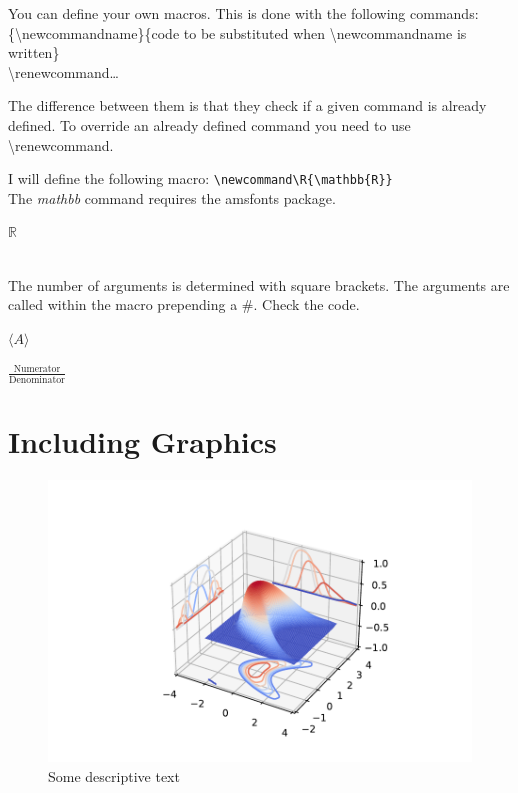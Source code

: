 \documentclass[a4paper]{article}
\newcommand{\bs}[1]{{\color{blue}\textbackslash{}#1}}
\begin{document}
You can define your own macros. This is done with the following commands:\\

\noindent\bs{newcommand}\{\bs{newcommandname}\}\{code to be substituted when \bs{newcommandname} is written\}\\
\bs{renewcommand}\dots

The difference between them is that they check if a given command is already defined. To override an already defined command you need to use \bs{renewcommand}.

\noindent I will define the following macro:
\noindent \verb!\newcommand\R{\mathbb{R}}!\\

\noindent The \emph{mathbb} command requires the amsfonts package.\\
 
\newcommand\R{\mathbb{R}} %


$\R$

\\

The number of arguments is determined with square brackets. The arguments are called within the macro prepending a \#. Check the code.

\newcommand\average[1]{\langle#1\rangle}

$\average{A}$\\

\newcommand\fraction[2]{\frac{#1}{#2}}

$\fraction{\text{Numerator}}{\text{Denominator}}$\\


\section{Including Graphics}

\begin{figure}[h]
  \includegraphics{Primer_figures/3dplot.pdf}
  \caption{Some descriptive text}\label{referencefigure}
\end{figure}
\end{document}
